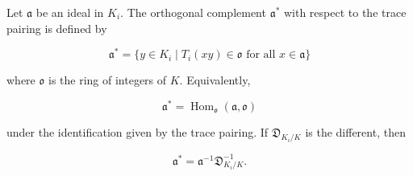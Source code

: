 Let $\mathfrak{a}$ be an ideal in $K_i$. The orthogonal complement $\mathfrak{a}^*$ with respect to the trace pairing is defined by

$$
\mathfrak{a}^* = \{ y \in K_i \mid T_i(xy) \in \mathfrak{o} \text{ for all } x \in \mathfrak{a} \}
$$

where $\mathfrak{o}$ is the ring of integers of $K$. Equivalently,

$$
\mathfrak{a}^* = \operatorname{Hom}_{\mathfrak{o}}(\mathfrak{a}, \mathfrak{o})
$$

under the identification given by the trace pairing. If $\mathfrak{D}_{K_i/K}$ is the different, then

$$
\mathfrak{a}^* = \mathfrak{a}^{-1} \mathfrak{D}_{K_i/K}^{-1}.
$$
